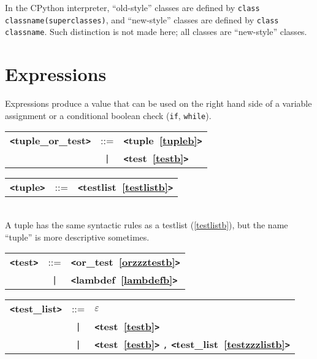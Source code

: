 \documentclass[12pt]{article}
\begin{document}

In the CPython interpreter, ``old-style'' classes are defined by
\verb+class classname(superclasses)+, and ``new-style'' classes are defined by 
\verb+class classname+.  Such distinction is not made here; all classes
are ``new-style'' classes.

\section{Expressions}
Expressions produce a value that can be used on the right hand side of a variable assignment or a conditional boolean check (\verb|if|, \verb|while|).

\label{tuplezzzorzzztestb}
\begin{tabular}{lcl}
{\bf \verb+<+tuple\_or\_test\verb+>+} & ::=  & {\bf \verb+<+tuple~\ref{tupleb}\verb+>+}  \\
 & \verb+|+  & {\bf \verb+<+test~\ref{testb}\verb+>+}  \\
\end{tabular}

\label{tupleb}
\begin{tabular}{lcl}
{\bf \verb+<+tuple\verb+>+} & ::=  & {\bf \verb+<+testlist~\ref{testlistb}\verb+>+}  \\
\end{tabular} \\

A tuple has the same syntactic rules as a testlist (\ref{testlistb}), but the name ``tuple'' is more descriptive sometimes.

\label{testb}

\begin{tabular}{lcl}
{\bf \verb+<+test\verb+>+} & ::=  & {\bf \verb+<+or\_test~\ref{orzzztestb}\verb+>+}  \\
 & \verb+|+  & {\bf \verb+<+lambdef~\ref{lambdefb}\verb+>+}  \\
\end{tabular}

\label{testzzzlistb}
\begin{tabular}{lcl}
{\bf \verb+<+test\_list\verb+>+} & ::=  & $\varepsilon$ \\
 & \verb+|+  & {\bf \verb+<+test~\ref{testb}\verb+>+}  \\
 & \verb+|+  & {\bf \verb+<+test~\ref{testb}\verb+>+}  \verb|,| {\bf \verb+<+test\_list~\ref{testzzzlistb}\verb+>+}  \\
\end{tabular}
\end{document}
